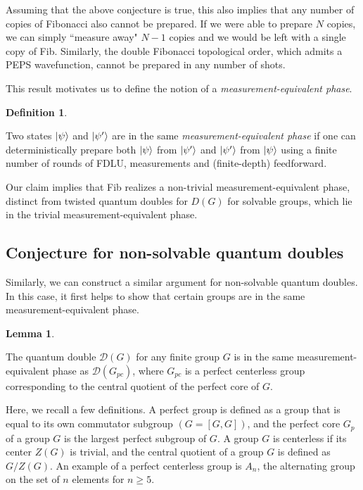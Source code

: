 \documentclass[nofootinbib,prx,twocolumn,showpacs,superscriptaddress,notitlepage,amsmath,amssymb]{revtex4-2}
\theoremstyle{definition}
\def\ket#1{\mathinner{|{#1}\rangle}}
\newtheorem{definition}[theorem]{Definition}
\newtheorem{lemma}[theorem]{Lemma}
\begin{document}
Assuming that the above conjecture is true, this also implies that any number of copies of Fibonacci also cannot be prepared. If we were able to prepare $N$ copies, we can simply ``measure away" $N-1$ copies and we would be left with a single copy of Fib. Similarly, the double Fibonacci topological order, which admits a PEPS wavefunction\cite{levin_string-net_2005,GuLevinSwingleWen09,Buerschaper09}, cannot be prepared in any number of shots.

This result motivates us to define the notion of a \textit{measurement-equivalent phase}.
\begin{definition}
\begin{shaded}
Two states $\ket{\psi}$ and $\ket{\psi'}$ are in the same \emph{measurement-equivalent phase} if one can deterministically prepare both $\ket{\psi}$ from $\ket{\psi'}$ and $\ket{\psi'}$ from $\ket{\psi}$ using a finite number of rounds of FDLU, measurements and (finite-depth) feedforward.
\end{shaded}
\end{definition}

Our claim implies that Fib realizes a non-trivial measurement-equivalent phase, 
distinct from twisted quantum doubles for $D(G)$ for solvable groups, which lie in the trivial measurement-equivalent phase.



\subsection{Conjecture for non-solvable quantum doubles}

Similarly, we can construct a similar argument for non-solvable quantum doubles. In this case, it first helps to show that certain groups are in the same measurement-equivalent phase.



\begin{lemma}
\begin{shaded}
The quantum double $\mathcal D(G)$ for any finite group $G$ is in the same measurement-equivalent phase as $\mathcal D(G_{pc})$, where $G_{pc}$ is a perfect centerless group corresponding to the central quotient of the perfect core of $G$.
\end{shaded}
\end{lemma}

Here, we recall a few definitions. A perfect group is defined as a group that is equal to its own commutator subgroup $(G=[G,G])$, and the perfect core $G_p$ of a group $G$ is the largest perfect subgroup of $G$. A group $G$ is centerless if its center $Z(G)$ is trivial, and the central quotient of a group $G$ is defined as $G/Z(G)$. An example of a perfect centerless group is $A_n$, the alternating group on the set of $n$ elements for $n\ge 5$.
\end{document}
